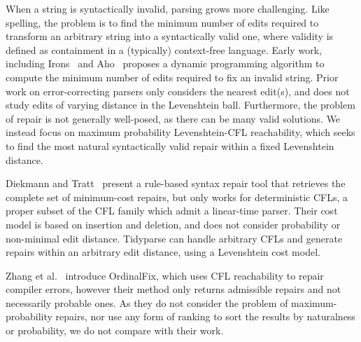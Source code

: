 \documentclass[popl.tex]{subfiles}
\begin{document}
When a string is syntactically invalid, parsing grows more challenging. Like spelling, the problem is to find the minimum number of edits required to transform an arbitrary string into a syntactically valid one, where validity is defined as containment in a (typically) context-free language. Early work, including Irons~\cite{irons1963error} and Aho~\cite{aho1972minimum} proposes a dynamic programming algorithm to compute the minimum number of edits required to fix an invalid string. Prior work on error-correcting parsers only considers the nearest edit(s), and does not study edits of varying distance in the Levenshtein ball. Furthermore, the problem of repair is not generally well-posed, as there can be many valid solutions. We instead focus on maximum probability Levenshtein-CFL reachability, which seeks to find the most natural syntactically valid repair within a fixed Levenshtein distance.

Diekmann and Tratt~\cite{diekmann2018dont} present a rule-based syntax repair tool that retrieves the complete set of minimum-cost repairs, but only works for deterministic CFLs, a proper subset of the CFL family which admit a linear-time parser. Their cost model is based on insertion and deletion, and does not consider probability or non-minimal edit distance. Tidyparse can handle arbitrary CFLs and generate repairs within an arbitrary edit distance, using a Levenshtein cost model.

Zhang et al.~\cite{zhang2023ordinalfix} introduce OrdinalFix, which uses CFL reachability to repair compiler errors, however their method only returns admissible repairs and not necessarily probable ones. As they do not consider the problem of maximum-probability repairs, nor use any form of ranking to sort the results by naturalness or probability, we do not compare with their work.

%
\end{document}
